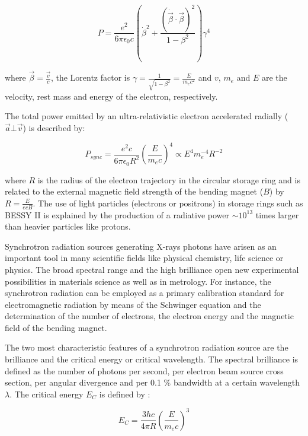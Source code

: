 \begin{equation}
        P=\frac{e^2}{6\pi\epsilon_0c}\left( \dot{\beta}^2 + \frac{(\dot{\vec{\beta}} \cdot \vec{\beta})^2}{1-\beta^2} \right) \gamma^4
\end{equation}

where $\vec{\beta}=\frac{\vec{v}}{c}$, the Lorentz factor is $\gamma=\frac{1}{\sqrt{1-\beta^2}}=\frac{E}{m_e c^2}$ and $v$, $m_e$ and $E$ are the velocity, rest mass and energy of the electron, respectively.

The total power emitted by an ultra-relativistic electron accelerated radially ($\vec{a} \bot \vec{v}$) is described by:

\begin{equation}
        P_{sync}=\frac{e^2 c}{6\pi\epsilon_0 R^2}\left(\frac{E}{m_e c}\right)^4 \propto E^4 m_e^{-4} R^{-2}
\end{equation}

where $R$ is the radius of the electron trajectory in the circular storage ring and is related to the external magnetic field strength of the bending magnet ($B$) by $R=\frac{E}{ecB}$. The use of light particles (electrons or positrons) in storage rings such as BESSY II is explained by the production of a radiative power $\sim 10^{13}$ times larger than heavier particles like protons.

Synchrotron radiation sources generating X-rays photons have arisen as an important tool in many scientific fields like physical chemistry, life science or physics. The broad spectral range and the high brilliance open new experimental possibilities in materials science as well as in metrology. For instance, the synchrotron radiation can be employed as a primary calibration standard for electromagnetic radiation \citep{thornagel_electron_2001} by means of the Schwinger equation \citep{schwinger_classical_1949} and the determination of the number of electrons, the electron energy and the magnetic field of the bending magnet.

The two most characteristic features of a synchrotron radiation source are the brilliance and the critical energy or critical wavelength. The spectral brilliance is defined as the number of photons per second, per electron beam source cross section, per angular divergence and per 0.1 $\%$ bandwidth at a certain wavelength $\lambda$\citep{baumgartel_e.-e._1984}. The critical energy $E_C$ is defined by \citep{schwinger_classical_1949}:

\begin{equation}
        E_C=\frac{3hc}{4\pi R}\left(\frac{E}{m_e c}\right)^3
\end{equation}

